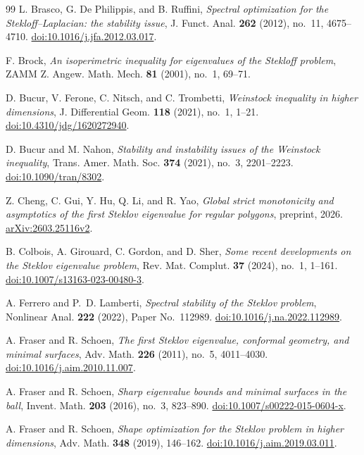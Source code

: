 \documentclass[11pt,reqno]{amsart}
\numberwithin{equation}{section}
\theoremstyle{remark}
\begin{document}
\begin{thebibliography}{99}
L. Brasco, G. De Philippis, and B. Ruffini,
\emph{Spectral optimization for the Stekloff--Laplacian: the stability issue},
J. Funct. Anal. \textbf{262} (2012), no.~11, 4675--4710.
\href{https://doi.org/10.1016/j.jfa.2012.03.017}{doi:10.1016/j.jfa.2012.03.017}.

F. Brock,
\emph{An isoperimetric inequality for eigenvalues of the Stekloff problem},
ZAMM Z. Angew. Math. Mech. \textbf{81} (2001), no.~1, 69--71.

D. Bucur, V. Ferone, C. Nitsch, and C. Trombetti,
\emph{Weinstock inequality in higher dimensions},
J. Differential Geom. \textbf{118} (2021), no.~1, 1--21.
\href{https://doi.org/10.4310/jdg/1620272940}{doi:10.4310/jdg/1620272940}.

D. Bucur and M. Nahon,
\emph{Stability and instability issues of the Weinstock inequality},
Trans. Amer. Math. Soc. \textbf{374} (2021), no.~3, 2201--2223.
\href{https://doi.org/10.1090/tran/8302}{doi:10.1090/tran/8302}.

Z. Cheng, C. Gui, Y. Hu, Q. Li, and R. Yao,
\emph{Global strict monotonicity and asymptotics of the first Steklov
eigenvalue for regular polygons}, preprint, 2026.
\href{https://arxiv.org/abs/2603.25116v2}{arXiv:2603.25116v2}.

B. Colbois, A. Girouard, C. Gordon, and D. Sher,
\emph{Some recent developments on the Steklov eigenvalue problem},
Rev. Mat. Complut. \textbf{37} (2024), no.~1, 1--161.
\href{https://doi.org/10.1007/s13163-023-00480-3}{doi:10.1007/s13163-023-00480-3}.

A. Ferrero and P.~D. Lamberti,
\emph{Spectral stability of the Steklov problem},
Nonlinear Anal. \textbf{222} (2022), Paper No.~112989.
\href{https://doi.org/10.1016/j.na.2022.112989}{doi:10.1016/j.na.2022.112989}.

A. Fraser and R. Schoen,
\emph{The first Steklov eigenvalue, conformal geometry, and minimal surfaces},
Adv. Math. \textbf{226} (2011), no.~5, 4011--4030.
\href{https://doi.org/10.1016/j.aim.2010.11.007}{doi:10.1016/j.aim.2010.11.007}.

A. Fraser and R. Schoen,
\emph{Sharp eigenvalue bounds and minimal surfaces in the ball},
Invent. Math. \textbf{203} (2016), no.~3, 823--890.
\href{https://doi.org/10.1007/s00222-015-0604-x}{doi:10.1007/s00222-015-0604-x}.

A. Fraser and R. Schoen,
\emph{Shape optimization for the Steklov problem in higher dimensions},
Adv. Math. \textbf{348} (2019), 146--162.
\href{https://doi.org/10.1016/j.aim.2019.03.011}{doi:10.1016/j.aim.2019.03.011}.


\end{thebibliography}
\end{document}
